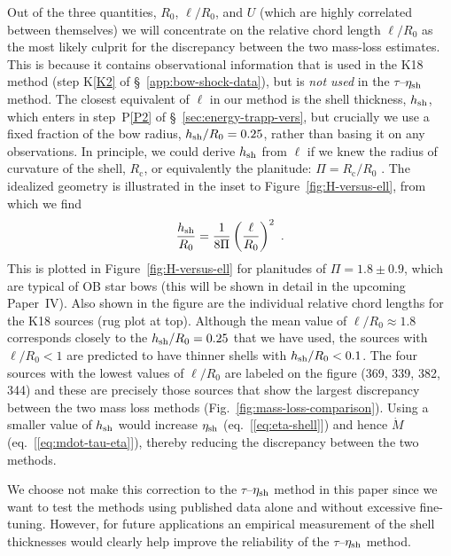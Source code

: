 
Out of the three quantities, \(R_0\), \(\ell/R_0\), and \(U\) (which
are highly correlated between themselves) we will concentrate on the
relative chord length \(\ell/R_0\) as the most likely culprit for the
discrepancy between the two mass-loss estimates.  This is because it
contains observational information that is used in the K18 method
(step K\ref{K2} of \S~\ref{app:bow-shock-data}), but is \textit{not
  used} in the \(\tau\)--\(\eta_{\text{sh}}\) method.  The closest
equivalent of \(\ell\) in our method is the shell thickness,
\(h_{\text{sh}}\), which enters in step~P\ref{P2} of
\S~\ref{sec:energy-trapp-vers}, but crucially we use a fixed fraction
of the bow radius, \(h_{\text{sh}} / R_0 = 0.25\), rather than basing it on
any observations.  In principle, we could derive \(h_{\text{sh}}\) from
\(\ell\) if we knew the radius of curvature of the shell,
\(R_{\text{c}}\), or equivalently the planitude:
\(\Pi = R_{\text{c}} / R_0\) \citep{Tarango-Yong:2018a}.  The idealized
geometry is illustrated in the inset to Figure~\ref{fig:H-versus-ell},
from which we find
\begin{equation}
  \label{eq:h-R0}
  \frac{h\shell}{R_0} = \frac{1}{8\Pi} \left(\frac{\ell}{R_0}\right)^2 \ .
\end{equation}
This is plotted in Figure~\ref{fig:H-versus-ell} for planitudes of
\(\Pi = 1.8 \pm 0.9\), which are typical of OB star bows (this will be
shown in detail in the upcoming Paper~IV).  Also shown in the figure
are the individual relative chord lengths for the K18 sources (rug
plot at top).  Although the mean value of \(\ell/R_0 \approx 1.8\)
corresponds closely to the \(h_{\text{sh}}/R_0 = 0.25\) that we have used,
the sources with \(\ell/R_0 < 1\) are predicted to have thinner shells
with \(h_{\text{sh}}/R_0 < 0.1\).  The four sources with the lowest values
of \(\ell/R_0\) are labeled on the figure (369, 339, 382, 344) and
these are precisely those sources that show the largest discrepancy
between the two mass loss methods
(Fig.~\ref{fig:mass-loss-comparison}).  Using a smaller value of
\(h_{\text{sh}}\) would increase \(\eta_{\text{sh}}\) (eq.~[\ref{eq:eta-shell}])
and hence \(\dot{M}\) (eq.~[\ref{eq:mdot-tau-eta}]), thereby reducing
the discrepancy between the two methods.

We choose not make this correction to the \(\tau\)--\(\eta_{\text{sh}}\)
method in this paper since we want to test the methods using published
data alone and without excessive fine-tuning.  However, for future
applications an empirical measurement of the shell thicknesses would
clearly help improve the reliability of the \(\tau\)--\(\eta_{\text{sh}}\)
method.

